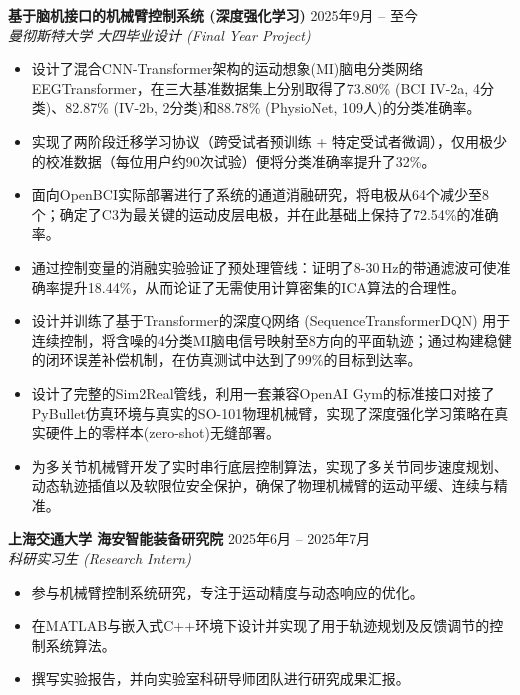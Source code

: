 \documentclass[11pt, a4paper]{article}
\newcommand{\entry}[2]{\textbf{#1} \hfill #2}
\begin{document}
\entry{基于脑机接口的机械臂控制系统 (深度强化学习)}{2025年9月 -- 至今} \\
\textit{曼彻斯特大学 大四毕业设计 (Final Year Project)}
\begin{itemize}[leftmargin=*, nosep, topsep=2pt]
    \item 设计了混合CNN-Transformer架构的运动想象(MI)脑电分类网络EEGTransformer，在三大基准数据集上分别取得了73.80\% (BCI IV-2a, 4分类)、82.87\% (IV-2b, 2分类)和88.78\% (PhysioNet, 109人)的分类准确率。
    \item 实现了两阶段迁移学习协议（跨受试者预训练 + 特定受试者微调），仅用极少的校准数据（每位用户约90次试验）便将分类准确率提升了32\%。
    \item 面向OpenBCI实际部署进行了系统的通道消融研究，将电极从64个减少至8个；确定了C3为最关键的运动皮层电极，并在此基础上保持了72.54\%的准确率。
    \item 通过控制变量的消融实验验证了预处理管线：证明了8-30\,Hz的带通滤波可使准确率提升18.44\%，从而论证了无需使用计算密集的ICA算法的合理性。
    \item 设计并训练了基于Transformer的深度Q网络 (SequenceTransformerDQN) 用于连续控制，将含噪的4分类MI脑电信号映射至8方向的平面轨迹；通过构建稳健的闭环误差补偿机制，在仿真测试中达到了99\%的目标到达率。
    \item 设计了完整的Sim2Real管线，利用一套兼容OpenAI Gym的标准接口对接了PyBullet仿真环境与真实的SO-101物理机械臂，实现了深度强化学习策略在真实硬件上的零样本(zero-shot)无缝部署。
    \item 为多关节机械臂开发了实时串行底层控制算法，实现了多关节同步速度规划、动态轨迹插值以及软限位安全保护，确保了物理机械臂的运动平缓、连续与精准。
\end{itemize}

\vspace{4pt}
\entry{上海交通大学 海安智能装备研究院}{2025年6月 -- 2025年7月} \\
\textit{科研实习生 (Research Intern)}
\begin{itemize}[leftmargin=*, nosep, topsep=2pt]
    \item 参与机械臂控制系统研究，专注于运动精度与动态响应的优化。
    \item 在MATLAB与嵌入式C++环境下设计并实现了用于轨迹规划及反馈调节的控制系统算法。
    \item 撰写实验报告，并向实验室科研导师团队进行研究成果汇报。
\end{itemize}
\end{document}
